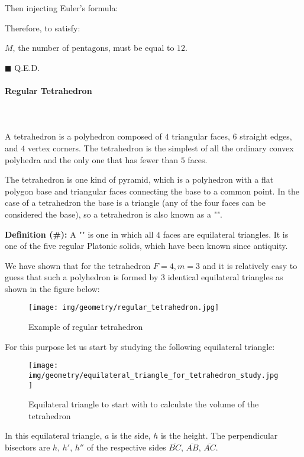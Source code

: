 {\begin{dem}
	Then injecting Euler's formula:
	
	Therefore, to satisfy:
	
	$M$, the number of pentagons, must be equal to $12$.
	\begin{flushright}
		$\blacksquare$  Q.E.D.
	\end{flushright}
	\end{dem}
	
	\paragraph{Regular Tetrahedron}\mbox{}\\\\
	A tetrahedron is a polyhedron composed of $4$ triangular faces, $6$ straight edges, and $4$ vertex corners. The tetrahedron is the simplest of all the ordinary convex polyhedra and the only one that has fewer than $5$ faces.
	
	The tetrahedron is one kind of pyramid, which is a polyhedron with a flat polygon base and triangular faces connecting the base to a common point. In the case of a tetrahedron the base is a triangle (any of the four faces can be considered the base), so a tetrahedron is also known as a "".
	
	\textbf{Definition (\#\mydef):} A "" is one in which all $4$ faces are equilateral triangles. It is one of the five regular Platonic solids, which have been known since antiquity.
	
	We have shown that for the tetrahedron $F=4,m=3$ and it is relatively easy to guess that such a polyhedron is formed by $3$ identical equilateral triangles as shown in the figure below:
	\begin{figure}[H]
		\centering
		\texttt{[image: img/geometry/regular\_tetrahedron.jpg]}
		\caption{Example of regular tetrahedron}
	\end{figure}
	For this purpose let us start by studying the following equilateral triangle:
	\begin{figure}[H]
		\centering
		\texttt{[image: img/geometry/equilateral\_triangle\_for\_tetrahedron\_study.jpg]}
		\caption[]{Equilateral triangle to start with to calculate the volume of the tetrahedron}
	\end{figure}
	In this equilateral triangle, $a$ is the side, $h$ is the height. The perpendicular bisectors are $h$, $h'$, $h''$ of the respective sides $\overline{BC}$, $\overline{AB}$, $\overline{AC}$.

}
